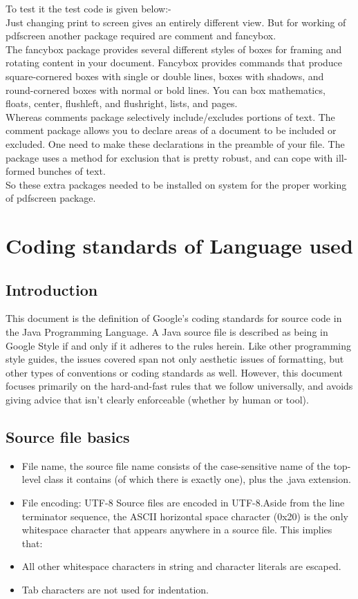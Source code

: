 \noindent To test it the test code is given below:-\\
Just changing print to screen gives an entirely different view. But for working of pdfscreen another package required are comment and fancybox.\\

\noindent The fancybox package provides several different styles of boxes for framing and rotating content in your document. Fancybox provides commands that produce square-cornered boxes with single or double lines, boxes with shadows, and round-cornered boxes with normal or bold lines. You can box mathematics, floats, center, flushleft, and flushright, lists, and pages.\\
 	
\noindent Whereas comments package selectively include/excludes portions of text. The comment package allows you to declare areas of a document to be included or excluded. One need to make these declarations in the preamble of your file. The package uses a method for exclusion that is pretty robust, and can cope with ill-formed bunches of text.\\

\noindent So these extra packages needed to be installed on system for the proper working of pdfscreen package.


	\section{Coding standards of Language used 
}

\subsection{Introduction}
This document is the definition of Google's coding standards for source code in the Java Programming Language. A Java source file is described as being in Google Style if and only if it adheres to the rules herein.
Like other programming style guides, the issues covered span not only aesthetic issues of formatting, but other types of conventions or coding standards as well. However, this document focuses primarily on the hard-and-fast rules that we follow universally, and avoids giving advice that isn't clearly enforceable (whether by human or tool).
\subsection{Source file basics}
\begin{itemize}
\item File name, the source file name consists of the case-sensitive name of the top-level class it contains (of which there is exactly one), plus the .java extension.
\item File encoding: UTF-8 Source files are encoded in UTF-8.Aside from the line terminator sequence, the ASCII horizontal space character (0x20) is the only whitespace character that appears anywhere in a source file. This implies that:
\item All other whitespace characters in string and character literals are escaped.
\item Tab characters are not used for indentation.
\end{itemize}

